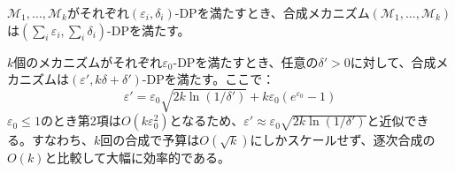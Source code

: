 \begin{property}
$\mathcal{M}_1, \ldots, \mathcal{M}_k$がそれぞれ$(\varepsilon_i, \delta_i)$-DPを満たすとき、合成メカニズム$(\mathcal{M}_1, \ldots, \mathcal{M}_k)$は$(\sum_i \varepsilon_i, \sum_i \delta_i)$-DPを満たす。
\end{property}

\begin{property}\label{prop:advanced}
$k$個のメカニズムがそれぞれ$\varepsilon_0$-DPを満たすとき、任意の$\delta' > 0$に対して、合成メカニズムは$(\varepsilon', k\delta + \delta')$-DPを満たす。ここで：
\[
\varepsilon' = \varepsilon_0 \sqrt{2k\ln(1/\delta')} + k\varepsilon_0(e^{\varepsilon_0} - 1)
\]
$\varepsilon_0 \leq 1$のとき第2項は$O(k\varepsilon_0^2)$となるため、$\varepsilon' \approx \varepsilon_0\sqrt{2k\ln(1/\delta')}$と近似できる。すなわち、$k$回の合成で予算は$O(\sqrt{k})$にしかスケールせず、逐次合成の$O(k)$と比較して大幅に効率的である。
\end{property}
